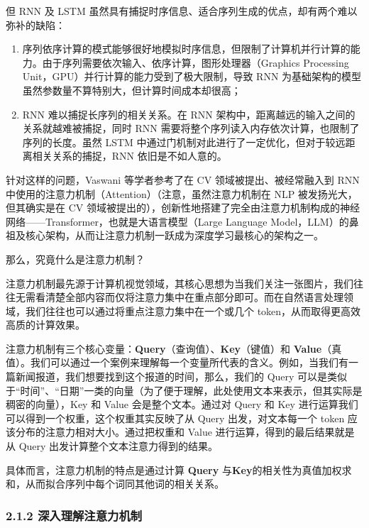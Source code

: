 \documentclass[
]{article}
\begin{document}
但 RNN 及 LSTM
虽然具有捕捉时序信息、适合序列生成的优点，却有两个难以弥补的缺陷：

\begin{enumerate}
\def\labelenumi{\arabic{enumi}.}
\item
  序列依序计算的模式能够很好地模拟时序信息，但限制了计算机并行计算的能力。由于序列需要依次输入、依序计算，图形处理器（Graphics
  Processing Unit，GPU）并行计算的能力受到了极大限制，导致 RNN
  为基础架构的模型虽然参数量不算特别大，但计算时间成本却很高；
\item
  RNN 难以捕捉长序列的相关关系。在 RNN
  架构中，距离越远的输入之间的关系就越难被捕捉，同时 RNN
  需要将整个序列读入内存依次计算，也限制了序列的长度。虽然 LSTM
  中通过门机制对此进行了一定优化，但对于较远距离相关关系的捕捉，RNN
  依旧是不如人意的。
\end{enumerate}

针对这样的问题，Vaswani 等学者参考了在 CV 领域被提出、被经常融入到 RNN
中使用的注意力机制（Attention）（注意，虽然注意力机制在 NLP
被发扬光大，但其确实是在 CV
领域被提出的），创新性地搭建了完全由注意力机制构成的神经网络------Transformer，也就是大语言模型（Large
Language
Model，LLM）的鼻祖及核心架构，从而让注意力机制一跃成为深度学习最核心的架构之一。

那么，究竟什么是注意力机制？

注意力机制最先源于计算机视觉领域，其核心思想为当我们关注一张图片，我们往往无需看清楚全部内容而仅将注意力集中在重点部分即可。而在自然语言处理领域，我们往往也可以通过将重点注意力集中在一个或几个
token，从而取得更高效高质的计算效果。

注意力机制有三个核心变量：\textbf{Query}（查询值）、\textbf{Key}（键值）和
\textbf{Value}（真值）。我们可以通过一个案例来理解每一个变量所代表的含义。例如，当我们有一篇新闻报道，我们想要找到这个报道的时间，那么，我们的
Query
可以是类似于``时间''、``日期''一类的向量（为了便于理解，此处使用文本来表示，但其实际是稠密的向量），Key
和 Value 会是整个文本。通过对 Query 和 Key
进行运算我们可以得到一个权重，这个权重其实反映了从 Query
出发，对文本每一个 token 应该分布的注意力相对大小。通过把权重和 Value
进行运算，得到的最后结果就是从 Query 出发计算整个文本注意力得到的结果。

\hspace{0pt}具体而言，注意力机制的特点是通过计算 \textbf{Query}
与\textbf{Key}的相关性为真值加权求和，从而拟合序列中每个词同其他词的相关关系。

\subsubsection{2.1.2
深入理解注意力机制}\label{ux6df1ux5165ux7406ux89e3ux6ce8ux610fux529bux673aux5236}
\end{document}
